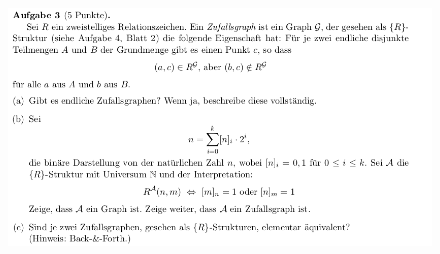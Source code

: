 \documentclass[a4paper]{scrartcl}
\begin{document}
    \begin{figure}[H]
        \centering
        \includegraphics[scale=0.6]{./A-3.png}
        \label{fig:}
    \end{figure}
\end{document}
